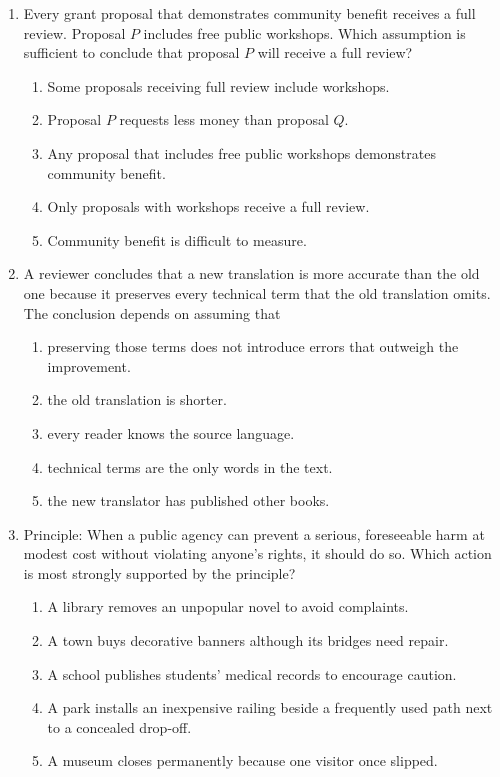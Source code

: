 \begin{enumerate}
\item Every grant proposal that demonstrates community benefit receives a full
review. Proposal $P$ includes free public workshops. Which assumption is
sufficient to conclude that proposal $P$ will receive a full review?
  \begin{enumerate}
  \item Some proposals receiving full review include workshops.
  \item Proposal $P$ requests less money than proposal $Q$.
  \item Any proposal that includes free public workshops demonstrates community
        benefit.
  \item Only proposals with workshops receive a full review.
  \item Community benefit is difficult to measure.
  \end{enumerate}

\item A reviewer concludes that a new translation is more accurate than the old
one because it preserves every technical term that the old translation omits.
The conclusion depends on assuming that
  \begin{enumerate}
  \item preserving those terms does not introduce errors that outweigh the
        improvement.
  \item the old translation is shorter.
  \item every reader knows the source language.
  \item technical terms are the only words in the text.
  \item the new translator has published other books.
  \end{enumerate}

\item Principle: When a public agency can prevent a serious, foreseeable harm at
modest cost without violating anyone's rights, it should do so. Which action is
most strongly supported by the principle?
  \begin{enumerate}
  \item A library removes an unpopular novel to avoid complaints.
  \item A town buys decorative banners although its bridges need repair.
  \item A school publishes students' medical records to encourage caution.
  \item A park installs an inexpensive railing beside a frequently used path
        next to a concealed drop-off.
  \item A museum closes permanently because one visitor once slipped.
  \end{enumerate}


\end{enumerate}
